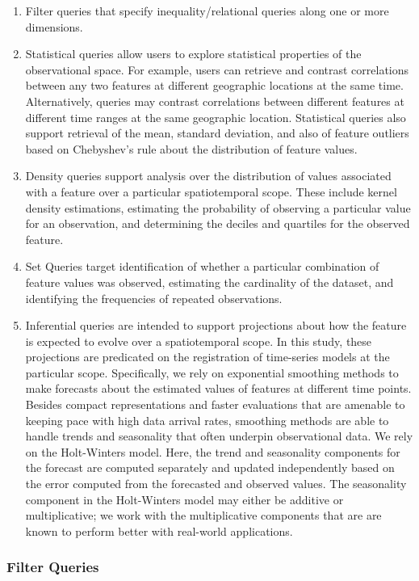\begin{enumerate} 
	\item	Filter queries that specify inequality/relational queries along one or more dimensions. 
	\item	Statistical queries allow users to explore statistical properties of the observational space. For example, users can retrieve and contrast correlations between any two features at different geographic locations at the same time. Alternatively, queries may contrast correlations between different features at different time ranges at the same geographic location. Statistical queries also support retrieval of the mean, standard deviation, and also of feature outliers based on Chebyshev’s rule about the distribution of feature values.
	\item	Density queries support analysis over the distribution of values associated with a feature over a particular spatiotemporal scope. These include kernel density estimations, estimating the probability of observing a particular value for an observation, and determining the deciles and quartiles for the observed feature. 
	\item	Set Queries target identification of whether a particular combination of feature values was observed, estimating the cardinality of the dataset, and identifying the frequencies of repeated observations.
	\item	Inferential queries are intended to support projections about how the feature is expected to evolve over a spatiotemporal scope. In this study, these projections are predicated on the registration of time-series models at the particular scope. Specifically, we rely on exponential smoothing methods to make forecasts about the estimated values of features at different time points. Besides compact representations and faster evaluations that are amenable to keeping pace with high data arrival rates, smoothing methods are able to handle trends and seasonality that often underpin observational data. We rely on the Holt-Winters model. Here, the trend and seasonality components for the forecast are computed separately and updated independently based on the error computed from the forecasted and observed values. The seasonality component in the Holt-Winters model may either be additive or multiplicative; we work with the multiplicative components that are are known to perform better with real-world applications. 
\end{enumerate}

\subsubsection{Filter Queries}

